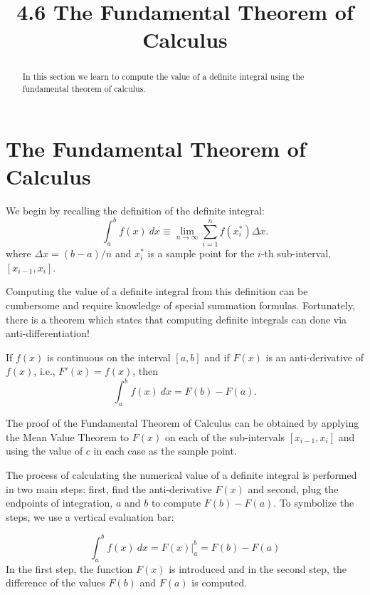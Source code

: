 \documentclass[handout]{ximera}
\title{4.6 The Fundamental Theorem of Calculus}
\begin{document}
\begin{abstract}
In this section we learn to compute the value of a definite integral using the fundamental theorem of calculus.
\end{abstract}

\maketitle



\section{The Fundamental Theorem of Calculus}

We begin by recalling the definition of the definite integral:
\[
\int_a^b f(x) \ dx \equiv \lim_{n\to \infty} \sum_{i=1}^n f(x_i^*)\Delta x.
\]
where $\Delta x = (b-a)/n$ and $x_i^*$ is a sample point for the $i$-th sub-interval, $[x_{i-1}, x_i]$.


Computing the value of a definite integral from this definition can be cumbersome and 
require knowledge of special summation formulas.  Fortunately, there is a theorem which states 
that computing definite integrals can done via anti-differentiation!


\begin{theorem}
If $f(x)$ is continuous on the interval $[a, b]$ and if $F(x)$ is an 
anti-derivative of $f(x)$, i.e., $F'(x) = f(x)$, then
\[
\int_a^b f(x) \ dx = F(b) - F(a).
\]
\end{theorem}


The proof of the Fundamental Theorem of Calculus can be obtained by applying the Mean Value Theorem to $F(x)$ on each of the sub-intervals $[x_{i-1}, x_i]$
and using the value of $c$ in each case as the sample point.


The process of calculating the numerical value of a definite integral is performed in 
two main steps: first, find the anti-derivative
$F(x)$ and  second, plug the endpoints of integration, $a$ and $b$ to compute $F(b) - F(a)$. 
To symbolize the steps, we use a vertical evaluation bar:

\[\int_a^b f(x) \ dx = F(x)\Big|_a^b = F(b) - F(a)\]
In the first step, the function $F(x)$ is introduced and in the second step, the difference of the values $F(b)$ and $F(a)$ is computed.
\end{document}
